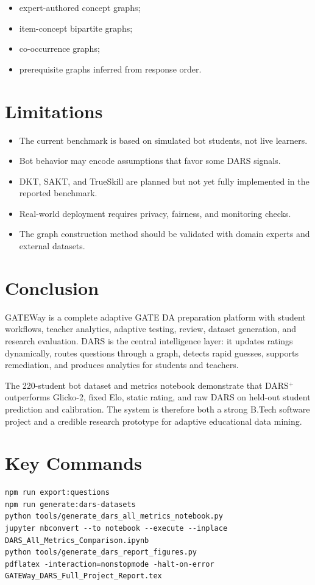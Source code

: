 \documentclass[12pt,a4paper]{report}
\begin{document}
\begin{itemize}[leftmargin=*]
  \item expert-authored concept graphs;
  \item item-concept bipartite graphs;
  \item co-occurrence graphs;
  \item prerequisite graphs inferred from response order.
\end{itemize}

\chapter{Limitations}
\begin{itemize}[leftmargin=*]
  \item The current benchmark is based on simulated bot students, not live learners.
  \item Bot behavior may encode assumptions that favor some DARS signals.
  \item DKT, SAKT, and TrueSkill are planned but not yet fully implemented in the reported benchmark.
  \item Real-world deployment requires privacy, fairness, and monitoring checks.
  \item The graph construction method should be validated with domain experts and external datasets.
\end{itemize}

\chapter{Conclusion}
GATEWay is a complete adaptive GATE DA preparation platform with student workflows, teacher analytics, adaptive testing, review, dataset generation, and research evaluation. DARS is the central intelligence layer: it updates ratings dynamically, routes questions through a graph, detects rapid guesses, supports remediation, and produces analytics for students and teachers.

The 220-student bot dataset and metrics notebook demonstrate that DARS$^+$ outperforms Glicko-2, fixed Elo, static rating, and raw DARS on held-out student prediction and calibration. The system is therefore both a strong B.Tech software project and a credible research prototype for adaptive educational data mining.

\appendix
\chapter{Key Commands}
\begin{verbatim}
npm run export:questions
npm run generate:dars-datasets
python tools/generate_dars_all_metrics_notebook.py
jupyter nbconvert --to notebook --execute --inplace DARS_All_Metrics_Comparison.ipynb
python tools/generate_dars_report_figures.py
pdflatex -interaction=nonstopmode -halt-on-error GATEWay_DARS_Full_Project_Report.tex
\end{verbatim}
\end{document}
